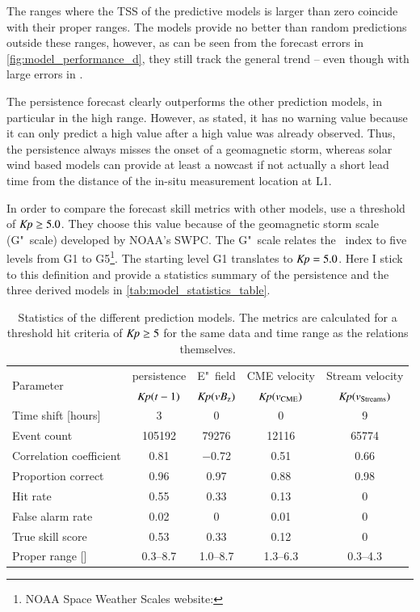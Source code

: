 The \Kp{} ranges where the TSS of the predictive models is larger than zero coincide with their proper ranges. The models provide no better than random predictions outside these ranges, however, as can be seen from the forecast errors in \autoref{fig:model_performance_d}, they still track the general trend -- even though with large errors in \Kp{}.

The persistence forecast clearly outperforms the other prediction models, in particular in the high \Kp{} range. However, as \citet{Detman1999} stated, it has no warning value because it can only predict a high \Kp{} value after a high \Kp{} value was already observed. Thus, the persistence always misses the onset of a geomagnetic storm, whereas solar wind based models can provide at least a nowcast if not actually a short lead time from the distance of the in-situ measurement location at L1.

In order to compare the \Kp{} forecast skill metrics with other models, \citet{Savani2017} use a threshold of $\textit{Kp}{} \geq 5.0$. They choose this value because of the geomagnetic storm scale (G"~scale) developed by NOAA's SWPC. The G"~scale relates the \Kp~index to five levels from G1 to G5\footnote{NOAA Space Weather Scales website: }. The starting level G1 translates to $\text{\textit{Kp}} = 5.0$. Here I stick to this definition and provide a statistics summary of the \Kp{} persistence and the three derived models in \autoref{tab:model_statistics_table}.
\begin{table}[htb]
	\caption{Statistics of the different prediction models. The metrics are calculated for a threshold hit criteria of $\textit{Kp}{} \geq 5$ for the same data and time range as the relations themselves.}
	\label{tab:model_statistics_table}
	\centering
	\begin{tabular}{lcccc}
		\hline\hline
		\multirow{2}{*}{Parameter}	&\Kp{} persistence	&E"~field	&CME velocity 	&Stream velocity\\
			&$\textit{Kp}(t-1)$	&$\textit{Kp}(\text{$vB_\text{z}$})$	&$\textit{Kp}(v_\text{CME})$	&$\textit{Kp}(v_\text{Streams})$\\
		\hline
		Time shift [hours]	&3	&0	&0	&9\\
		Event count	&\num{105192}	&\num{79276}	&\num{12116}	&\num{65774}\\
		Correlation coefficient	&0.81	&\num{-0.72}	&0.51	&0.66\\
		\hline
		Proportion correct	&0.96	&0.97	&0.88	&0.98\\
		Hit rate	&0.55	&0.33	&0.13	&0\\
		False alarm rate	&0.02	&0	&0.01	&0\\
		True skill score	&0.53	&0.33	&0.12	&0\\
		Proper range [\Kp{}]	&\numrange{0.3}{8.7}	&\numrange{1.0}{8.7}	&\numrange{1.3}{6.3}	&\numrange{0.3}{4.3}\\
		\hline
	\end{tabular}
\end{table}

